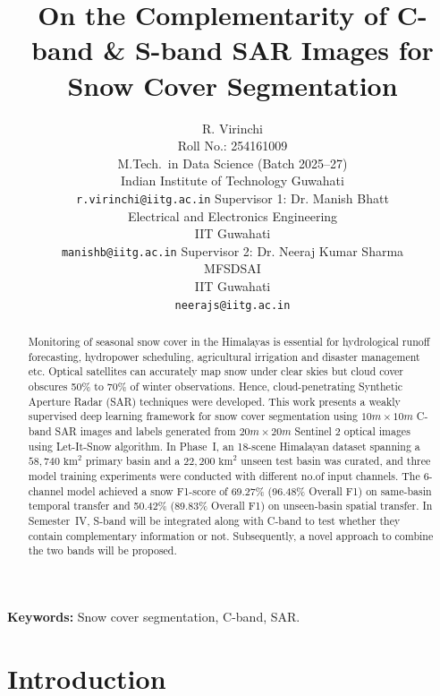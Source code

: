 \documentclass{article}
\title{On the Complementarity of C-band \& S-band SAR Images for Snow Cover Segmentation}
\author{%
  R. Virinchi \\
  Roll No.: 254161009 \\
  M.Tech.\ in Data Science (Batch 2025--27) \\
  Indian Institute of Technology Guwahati \\
  \texttt{r.virinchi@iitg.ac.in}
  \AND
  Supervisor 1: Dr. Manish Bhatt \\
  Electrical and Electronics Engineering \\
  IIT Guwahati \\
  \texttt{manishb@iitg.ac.in}
  \And
  Supervisor 2: Dr. Neeraj Kumar Sharma \\
  MFSDSAI \\
  IIT Guwahati \\
  \texttt{neerajs@iitg.ac.in}
}
\newif\ifshowguide
\newcommand{\guide}[1]{%
  \ifshowguide
    \par\medskip\noindent
    \fcolorbox{blue!50}{blue!4}{%
      \begin{minipage}{\dimexpr\linewidth-2\fboxsep-2\fboxrule\relax}
        \small\color{blue!55!black}\textbf{Guidance.} #1
      \end{minipage}}%
    \par\medskip
  \fi}
\begin{document}
\maketitle

\begin{abstract}
  \guide{One paragraph, at most 200 words. Answer, in this order: (i) What problem
  are you solving and why does it matter? (ii) What is your approach? (iii) What
  have you achieved so far in Phase~I (give at least one concrete number if you
  have results)? (iv) What will you do in Semester~IV? Do not cite references
  here.}
  Monitoring of seasonal snow cover in the Himalayas is essential for hydrological runoff forecasting, hydropower scheduling, agricultural irrigation and disaster management etc. Optical satellites can accurately map snow under clear skies but cloud cover obscures 50\% to 70\% of winter observations. Hence, cloud-penetrating Synthetic Aperture Radar (SAR) techniques were developed. This work presents a weakly supervised deep learning framework for snow cover segmentation using $10m \times 10m$ C-band SAR images and labels generated from $20m \times 20m$ Sentinel 2 optical images using Let-It-Snow algorithm. In Phase~I, an 18-scene Himalayan dataset spanning a $58{,}740\text{ km}^2$ primary basin and a $22{,}200\text{ km}^2$ unseen test basin was curated, and three model training experiments were conducted with different no.of input channels. The 6-channel model achieved a snow F1-score of 69.27\% (96.48\% Overall F1) on same-basin temporal transfer and 50.42\% (89.83\% Overall F1) on unseen-basin spatial transfer. In Semester~IV, S-band will be integrated along with C-band to test whether they contain complementary information or not. Subsequently, a novel approach to combine the two bands will be proposed.
\end{abstract}

\noindent\textbf{Keywords:} Snow cover segmentation, C-band, SAR.

\section{Introduction}
\label{sec:intro}

\guide{About one page. A reader who stops after this section should know exactly
what you are doing and how far you have got. Use the four paragraphs below and
keep their headings. Throughout this report, \emph{Phase~I} means the MTP work
done in Semester~III, and \emph{Phase~II} the work to be done in Semester~IV.}
\end{document}
